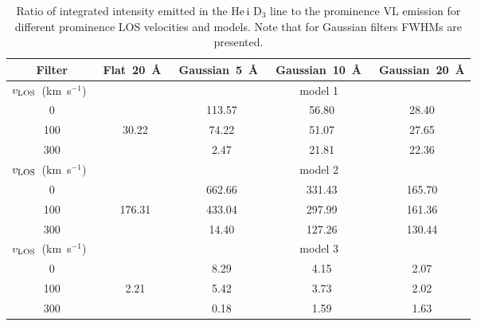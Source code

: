 \documentclass[namedreferences]{solarphysics}
\begin{document}
\begin{article}
\begin{table}  %
\caption{Ratio of integrated intensity emitted in the He\,{\sc i} D$_{3}$ line to the prominence VL emission for different prominence LOS velocities and models. 
Note that for Gaussian filters FWHMs are presented.}
\label{t-rms}
\begin{tabular}{ccccc} 
\hline Filter  & Flat~20~\AA~ & Gaussian~5~\AA~& Gaussian~10~\AA~& Gaussian~20~\AA \\
\hline
{$v_{\rm LOS}$}~(km~s$^{-1}$)~&~&~&model 1~&\\
\hline
   0  &    &    113.57   &    56.80   &    28.40 \\
   100  &   30.22&   74.22  &   51.07  &   27.65 \\
   300  &  &   2.47  &   21.81  &   22.36 \\
\hline
{$v_{\rm LOS}$}~(km~s$^{-1}$)~&~&~&model 2~&\\
\hline
   0  &    &    662.66   &    331.43   &    165.70 \\
   100  &   176.31&   433.04  &   297.99 &   161.36\\
   300  &  &   14.40  &  127.26  &   130.44 \\
\hline
{$v_{\rm LOS}$}~(km~s$^{-1}$)~&~&~&model 3~&\\
\hline
   0  &    &    8.29  &   4.15   &   2.07 \\
   100  &  2.21&   5.42  &  3.73 &   2.02\\
   300  &  &  0.18  &  1.59  &   1.63 \\
\hline
\end{tabular}
\end{table}


\end{article}
\end{document}
